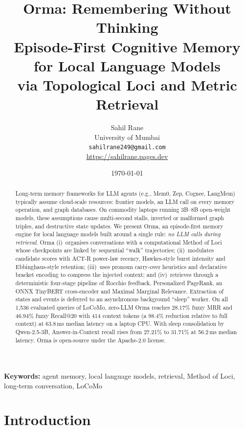 \documentclass[11pt]{article}
\title{\textbf{Orma: Remembering Without Thinking}\\[6pt]
\large Episode-First Cognitive Memory for Local Language Models\\
via Topological Loci and Metric Retrieval}
\author{Sahil Rane\\
University of Mumbai\\
\small\texttt{sahilrane249@gmail.com}\\
\small\url{https://sahilrane.pages.dev}}
\date{\today}
\newcommand{\orma}{\mbox{Orma}}
\begin{document}
\maketitle

\begin{abstract}
Long-term memory frameworks for LLM agents (e.g., Mem0, Zep, Cognee, LangMem) typically assume cloud-scale resources: frontier models, an LLM call on every memory operation, and graph databases.
On commodity laptops running 3B--8B open-weight models, these assumptions cause multi-second stalls, inverted or malformed graph triples, and destructive state updates.
We present \orma, an episode-first memory engine for local language models built around a single rule: \emph{no LLM calls during retrieval}.
\orma{} (i)~organises conversations with a computational Method of Loci whose checkpoints are linked by sequential ``walk'' trajectories;
(ii)~modulates candidate scores with ACT-R power-law recency, Hawkes-style burst intensity and Ebbinghaus-style retention;
(iii)~uses pronoun carry-over heuristics and declarative bracket encoding to compress the injected context; and
(iv)~retrieves through a deterministic four-stage pipeline of Rocchio feedback, Personalized PageRank, an ONNX TinyBERT cross-encoder and Maximal Marginal Relevance.
Extraction of states and events is deferred to an asynchronous background ``sleep'' worker.
On all 1,536 evaluated queries of LoCoMo, zero-LLM \orma{} reaches 28.17\% fuzzy MRR and 46.94\% fuzzy Recall@20 with 414 context tokens (a 98.4\% reduction relative to full context) at 63.8\,ms median latency on a laptop CPU.
With sleep consolidation by Qwen-2.5-3B, Answer-in-Context recall rises from 27.21\% to 31.71\% at 56.2\,ms median latency.
\orma{} is open-source under the Apache-2.0 license.
\end{abstract}

\noindent\textbf{Keywords:} agent memory, local language models, retrieval, Method of Loci, long-term conversation, LoCoMo

\section{Introduction}
\label{sec:intro}
\end{document}
